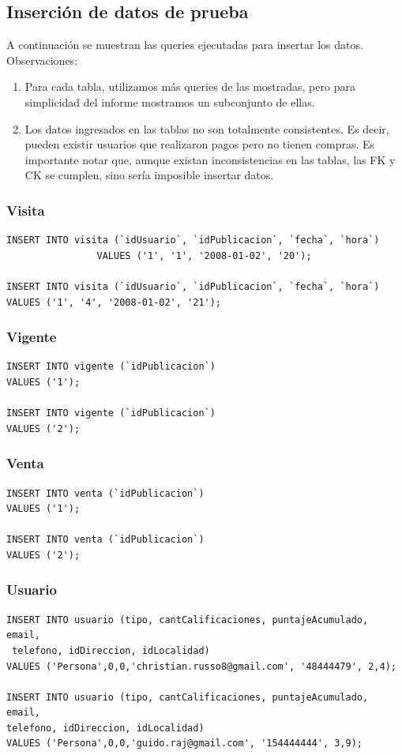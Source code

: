\documentclass[a4paper, 10pt, twoside]{article}
\begin{document}
\subsection{Inserci\'on de datos de prueba}

A continuaci\'on se muestran las queries ejecutadas para insertar los datos.
Observaciones:
\begin{enumerate}
\item Para cada tabla, utilizamos m\'as queries de las mostradas, pero para simplicidad del informe mostramos un subconjunto de ellas.
\item Los datos ingresados en las tablas no son totalmente consistentes. Es decir, pueden existir usuarios que realizaron pagos pero no
  tienen compras. Es importante notar que, aunque existan inconsistencias en las tablas, las FK y CK se cumplen, sino ser\'ia imposible insertar datos.

\end{enumerate}
\subsubsection{Visita}
\begin{verbatim}
INSERT INTO visita (`idUsuario`, `idPublicacion`, `fecha`, `hora`) 
				VALUES ('1', '1', '2008-01-02', '20');
				
INSERT INTO visita (`idUsuario`, `idPublicacion`, `fecha`, `hora`) 
VALUES ('1', '4', '2008-01-02', '21');
\end{verbatim}
\subsubsection{Vigente}
\begin{verbatim}
INSERT INTO vigente (`idPublicacion`) 
VALUES ('1');

INSERT INTO vigente (`idPublicacion`) 
VALUES ('2');
\end{verbatim}
\subsubsection{Venta}
\begin{verbatim}
INSERT INTO venta (`idPublicacion`) 
VALUES ('1');

INSERT INTO venta (`idPublicacion`) 
VALUES ('2');
\end{verbatim}
\subsubsection{Usuario}
\begin{verbatim}
INSERT INTO usuario (tipo, cantCalificaciones, puntajeAcumulado, email,
 telefono, idDireccion, idLocalidad) 
VALUES ('Persona',0,0,'christian.russo8@gmail.com', '48444479', 2,4);

INSERT INTO usuario (tipo, cantCalificaciones, puntajeAcumulado, email, 
telefono, idDireccion, idLocalidad)
VALUES ('Persona',0,0,'guido.raj@gmail.com', '154444444', 3,9);
\end{verbatim}
\end{document}
